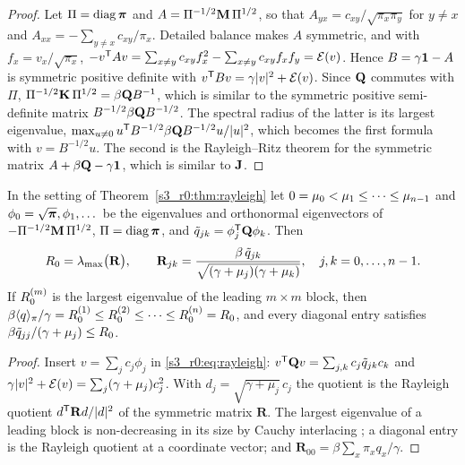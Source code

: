 \begin{proof}
  Let $\Pi=\operatorname{diag}\boldsymbol{\pi}$ and $A=\Pi^{-1/2}\mathbf{M}\,\Pi^{1/2}$, so that $A_{yx}=c_{xy}/\sqrt{\pi_x\pi_y}$ for
  $y\ne x$ and $A_{xx}=-\sum_{y\ne x}c_{xy}/\pi_x$.  Detailed balance makes $A$ symmetric, and with
  $f_x=v_x/\sqrt{\pi_x}$,
  $-v^{\mathsf{T}}Av=\sum_{x\ne y}c_{xy}f_x^2-\sum_{x\ne y}c_{xy}f_xf_y=\mathcal{E}(v)$.
  Hence $B=\gamma\mathbf{1}-A$ is symmetric positive definite with $v^{\mathsf{T}}Bv=\gamma|v|^2+\mathcal{E}(v)$.  Since $\mathbf{Q}$
  commutes with $\Pi$, $\Pi^{-1/2}\mathbf{K}\,\Pi^{1/2}=\beta\mathbf{Q} B^{-1}$, which is similar to the symmetric positive
  semi-definite matrix $B^{-1/2}\beta\mathbf{Q} B^{-1/2}$.  The spectral radius of the latter is its largest
  eigenvalue, $\max_{u\ne0}u^{\mathsf{T}}B^{-1/2}\beta\mathbf{Q} B^{-1/2}u/|u|^2$, which becomes the first formula with
  $v=B^{-1/2}u$.  The second is the Rayleigh--Ritz theorem \citep{horn2013matrix} for the symmetric matrix
  $A+\beta\mathbf{Q}-\gamma\mathbf{1}$, which is similar to $\mathbf{J}$.
\end{proof}

\begin{corollary}\label{s3_r0:cor:modal}
  In the setting of Theorem~\ref{s3_r0:thm:rayleigh} let $0=\mu_0<\mu_1\le\dots\le\mu_{n-1}$ and
  $\phi_0=\sqrt{\boldsymbol{\pi}},\phi_1,\dots$ be the eigenvalues and orthonormal eigenvectors of
  $-\Pi^{-1/2}\mathbf{M}\,\Pi^{1/2}$, $\Pi=\operatorname{diag}\boldsymbol{\pi}$, and $\tilde q_{jk}=\phi_j^{\mathsf{T}}\mathbf{Q}\phi_k$.  Then
  \begin{equation}\label{s3_r0:eq:modal}
    R_0=\lambda_{\max}\bigl(\mathbf{R}\bigr),\qquad
    \mathbf{R}_{jk}=\frac{\beta\,\tilde q_{jk}}{\sqrt{(\gamma+\mu_j)(\gamma+\mu_k)}},\quad j,k=0,\dots,n-1 .
  \end{equation}
  If $R_0^{(m)}$ is the largest eigenvalue of the leading $m\times m$ block, then
  $\beta\langle q\rangle_{\pi}/\gamma=R_0^{(1)}\le R_0^{(2)}\le\dots\le R_0^{(n)}=R_0$, and every diagonal entry satisfies
  $\beta\tilde q_{jj}/(\gamma+\mu_j)\le R_0$.
\end{corollary}

\begin{proof}
  Insert $v=\sum_jc_j\phi_j$ in \eqref{s3_r0:eq:rayleigh}: $v^{\mathsf{T}}\mathbf{Q} v=\sum_{j,k}c_j\tilde q_{jk}c_k$ and
  $\gamma|v|^2+\mathcal{E}(v)=\sum_j(\gamma+\mu_j)c_j^2$.  With $d_j=\sqrt{\gamma+\mu_j}\,c_j$ the quotient is the
  Rayleigh quotient $d^{\mathsf{T}}\mathbf{R}d/|d|^2$ of the symmetric matrix $\mathbf{R}$.  The largest eigenvalue of
  a leading block is non-decreasing in its size by Cauchy interlacing \citep{horn2013matrix}; a diagonal entry
  is the Rayleigh quotient at a coordinate vector; and $\mathbf{R}_{00}=\beta\sum_x\pi_xq_x/\gamma$.
\end{proof}

